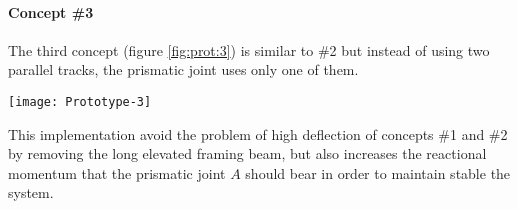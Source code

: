 	\paragraph{Concept \#3}	The third concept (figure \ref{fig:prot:3}) is similar to \#2 but instead of using two parallel tracks, the prismatic joint uses only one of them.

	\begin{SCfigure}[1.5][bht]
		\centering \texttt{[image: Prototype-3]}
		\caption{concept \#3  realised with a combination of both prismatic and revolute joint.}
		\label{fig:prot:3}
	\end{SCfigure}

	This implementation avoid the problem of high deflection of concepts \#1 and \#2 by removing the long elevated framing beam, but also increases the reactional momentum that the prismatic joint $A$ should bear in order to maintain stable the system.
	
	

	
	
	
	
	
	
	
	
	
	
	
	
	
	
	
	
	
	
	
	
	
	
	
	
	
	
	
	
	
	
	
	
	
	
	
	
	
	
	
	
	
	
	
	
	
	